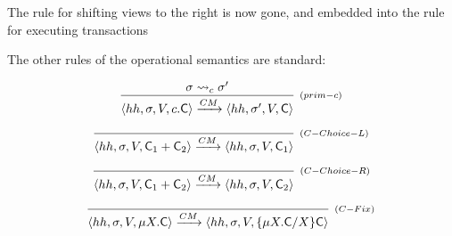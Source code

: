 \documentclass[a4paper,UKenglish]{article}%
\theoremstyle{plain}
\begin{document}
\ac{The rule for shifting views to the right is now gone, and embedded into the rule for executing transactions}

The other rules of the operational semantics are standard: 

\[
\infer[{\scriptstyle{(prim-c)}}]
{\langle \hh, \thdstack, V, \primc.\cmd \rangle \xrightarrow{CM} \langle \hh, \thdstack', V, \cmd \rangle}
{\thdstack \rightsquigarrow_c \thdstack'} 
\]

\[
\infer[{\scriptstyle{(C-Choice-L)}}]
{\langle \hh, \thdstack, V, \cmd_1 + \cmd_2 \rangle \xrightarrow{CM} \langle \hh, \thdstack, V, \cmd_1 \rangle}
{} 
\]

\[
\infer[{\scriptstyle{(C-Choice-R)}}]
{\langle \hh, \thdstack, V, \cmd_1 + \cmd_2 \rangle \xrightarrow{CM} \langle \hh, \thdstack, V, \cmd_2 \rangle}
{} 
\]

\[
\infer[{\scriptstyle{(C-Fix)}}]
{\langle \hh, \thdstack, V, \mu X.\cmd \rangle \xrightarrow{CM} \langle \hh, \thdstack, V, \{\mu X.\cmd/X\}\cmd \rangle}
{} 
\]

%
%
%

\end{document}
